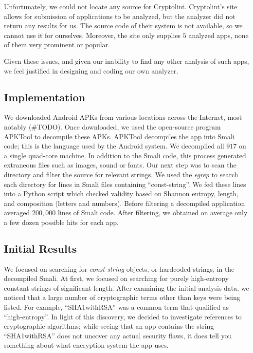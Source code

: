 \documentclass[11pt]{article}
\numberwithin{theorem}{subsection}
\begin{document}
Unfortunately, we could not locate any source for Cryptolint. Cryptolint's site allows for submission of
applications to be analyzed, but the analyzer did not return any results for us.  The source code of their
system is not available, so we cannot use it for ourselves.   Moreover, the site only supplies $5$ analyzed apps, 
none of them very prominent or popular. 

Given these issues, and given our inability to find any other analysis of such apps, we feel justified in designing 
and coding our own analyzer.

\subsection{Implementation}
We downloaded Android APKs from various locations across the Internet, most notably (#TODO). Once downloaded, we used
the open-source program APKTool \cite{APKTool} to decompile these APKs.  APKTool decompiles the app into Smali code; this
is the language used by the Android system.
We decompiled all $917$ on a single quad-core machine. In addition to the Smali code, this process generated extraneous files
such as images, sound or fonts. 
  Our next step was to scan the directory and filter the source for relevant strings. We used the \textit{egrep} to search
each directory for lines in Smali files containing ``const-string''. We fed these lines into a Python script
which checked validity based on Shannon entropy, length, and composition (letters and numbers). Before filtering a
decompiled application averaged $200,000$ lines of Smali code. After filtering, we obtained on average only a few dozen
possible hits for each app.
\subsection{Initial Results}

  We focused on searching for \textit{const-string} objects, or hardcoded strings, in the decompiled Smali.
At first, we focused on searching for purely high-entropy constant strings of significant length. 
After examining the initial analysis data, we noticed that a large number of cryptographic terms other than keys were being
listed. For example, ``SHA1withRSA'' was a common term that qualified as ``high-entropy''. In light of this discovery,
we decided to investigate references to cryptographic algorithms; while seeing that an app contains the string ``SHA1withRSA''
does not uncover any actual security flaws, it does tell you something about what encryption system the app uses.
\end{document}

